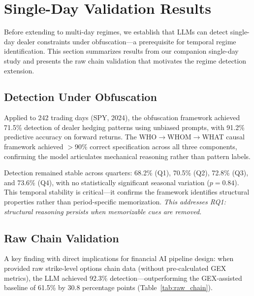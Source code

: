\section{Single-Day Validation Results}
\label{sec:single_day}

Before extending to multi-day regimes, we establish that LLMs can detect single-day dealer constraints under obfuscation---a prerequisite for temporal regime identification. This section summarizes results from our companion single-day study \citep{regan2025obfuscation} and presents the raw chain validation that motivates the regime detection extension.

\subsection{Detection Under Obfuscation}

Applied to 242 trading days (SPY, 2024), the obfuscation framework achieved 71.5\% detection of dealer hedging patterns using unbiased prompts, with 91.2\% predictive accuracy on forward returns. The WHO$\rightarrow$WHOM$\rightarrow$WHAT causal framework achieved $>$90\% correct specification across all three components, confirming the model articulates mechanical reasoning rather than pattern labels.

Detection remained stable across quarters: 68.2\% (Q1), 70.5\% (Q2), 72.8\% (Q3), and 73.6\% (Q4), with no statistically significant seasonal variation ($p = 0.84$). This temporal stability is critical---it confirms the framework identifies structural properties rather than period-specific memorization. \textit{This addresses RQ1: structural reasoning persists when memorizable cues are removed.}

\subsection{Raw Chain Validation}
\label{subsec:raw_chain}

A key finding with direct implications for financial AI pipeline design: when provided raw strike-level options chain data (without pre-calculated GEX metrics), the LLM achieved 92.3\% detection---outperforming the GEX-assisted baseline of 61.5\% by 30.8 percentage points (Table~\ref{tab:raw_chain}).

